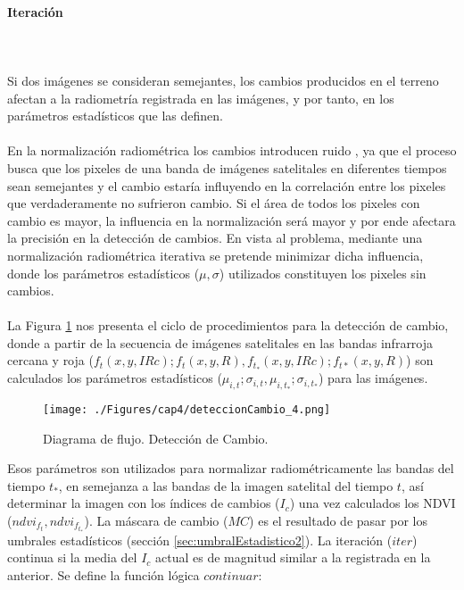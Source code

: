 \paragraph{Iteraci\'on}\label{subsec:iteracion}\mbox{}\\\mbox{}\\
 Si dos im\'agenes se consideran semejantes, los cambios producidos en el terreno afectan a la radiometr\'ia registrada en las im\'agenes, y por tanto, en los par\'ametros estad\'isticos que las definen.\\~\\
En la normalizaci\'on radiom\'etrica los cambios introducen ruido \cite{martinez2013normalizacion}, ya que el proceso busca que los pixeles de una banda de im\'agenes satelitales en diferentes tiempos sean semejantes y el cambio estar\'ia influyendo en la correlaci\'on entre los pixeles que verdaderamente no sufrieron cambio. Si el \'area de todos los pixeles con cambio es mayor, la influencia en la normalizaci\'on ser\'a mayor y por ende afectara la precisi\'on en la detecci\'on de cambios. En vista al problema, mediante una normalizaci\'on radiom\'etrica iterativa se pretende minimizar dicha influencia, donde los par\'ametros estad\'isticos ($ \mu,\sigma $) utilizados constituyen los pixeles sin cambios.\\~\\	
La Figura \ref{fig:deteccionCambio} nos presenta el ciclo de procedimientos para la detecci\'on de cambio, donde a partir de la secuencia de im\'agenes satelitales en las bandas infrarroja cercana y roja ($ f_{t}(x,y,IRc);f_{t}(x,y,R), f_{t_{*}}(x,y,IRc);f_{t*}(x,y,R) $) son calculados los par\'ametros estad\'isticos ($ \mu_{i,t};\sigma_{i,t}, \mu_{i,t_{*}};\sigma_{i,t_{*}} $) para las im\'agenes.
\begin{figure}[H]
	\centering
	\texttt{[image: ./Figures/cap4/deteccionCambio\_4.png]}
	\caption{Diagrama de flujo. Detecci\'on de Cambio.}
	\label{fig:deteccionCambio}
\end{figure}
 Esos par\'ametros son utilizados para normalizar radiom\'etricamente las bandas del tiempo $ t_{*} $, en semejanza a las bandas de la imagen satelital del tiempo $ t $, as\'i determinar la imagen con los \'indices de cambios ($ I_{c} $) una vez calculados los NDVI ($ ndvi_{f_{t}},ndvi_{f_{t_{*}}} $). La m\'ascara de cambio ($ MC $) es el resultado de pasar por los umbrales estad\'isticos (secci\'on \ref{sec:umbralEstadistico2}). La iteraci\'on ($ iter $) continua si la media del $ I_{c} $ actual es de magnitud similar a la registrada en la anterior. Se define la función l\'ogica $ continuar $:
